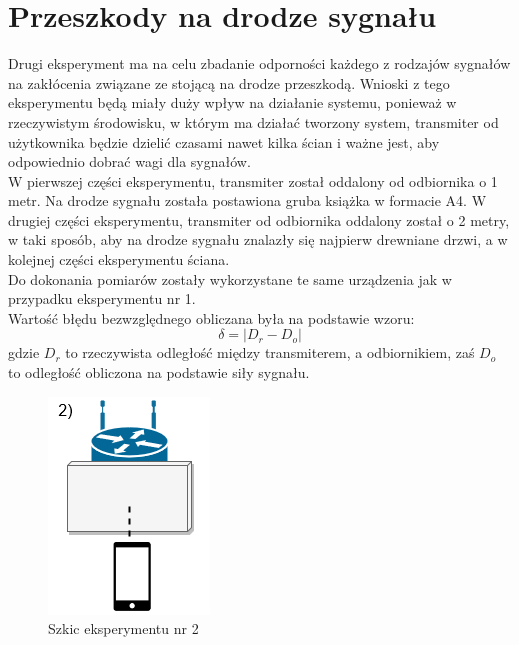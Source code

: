 \section{Przeszkody na drodze sygnału}
Drugi eksperyment ma na celu zbadanie odporności każdego z rodzajów sygnałów na zakłócenia związane ze stojącą na drodze przeszkodą. Wnioski z tego eksperymentu będą miały duży wpływ na działanie systemu, ponieważ w rzeczywistym środowisku, w którym ma działać tworzony system, transmiter od użytkownika będzie dzielić czasami nawet kilka ścian i ważne jest, aby odpowiednio dobrać wagi dla sygnałów.\\
W pierwszej części eksperymentu, transmiter został oddalony od odbiornika o 1 metr. Na drodze sygnału została postawiona gruba książka w formacie A4. W drugiej części eksperymentu, transmiter od odbiornika oddalony został o 2 metry, w taki sposób, aby na drodze sygnału znalazły się najpierw drewniane drzwi, a w kolejnej części eksperymentu ściana.\\
Do dokonania pomiarów zostały wykorzystane te same urządzenia jak w przypadku eksperymentu nr 1.\\
Wartość błędu bezwzględnego obliczana była na podstawie wzoru:
\begin{equation}
\delta = |D_r - D_o|
\end{equation}
gdzie $D_r$ to rzeczywista odległość między transmiterem, a odbiornikiem, zaś $D_o$ to odległość obliczona na podstawie siły sygnału.
\begin{figure}[H]
	\centering			
	\caption{Szkic eksperymentu nr 2}
	\includegraphics{exper2}
\end{figure}
